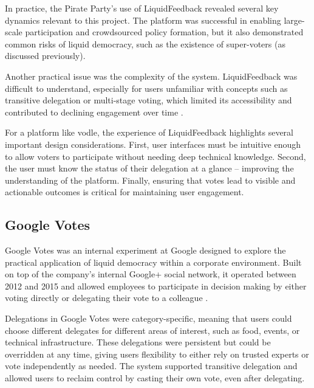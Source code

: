 In practice, the Pirate Party's use of LiquidFeedback revealed several key dynamics relevant to this project. The platform was successful in enabling large-scale participation and crowdsourced policy formation, but it also demonstrated common risks of liquid democracy, such as the existence of super-voters (as discussed previously).

Another practical issue was the complexity of the system. LiquidFeedback was difficult to understand, especially for users unfamiliar with concepts such as transitive delegation or multi-stage voting, which limited its accessibility and contributed to declining engagement over time \citep{kling2015votingbehaviourpoweronline}.

For a platform like vodle, the experience of LiquidFeedback highlights several important design considerations. First, user interfaces must be intuitive enough to allow voters to participate without needing deep technical knowledge. Second, the user must know the status of their delegation at a glance -- improving the understanding of the platform. Finally, ensuring that votes lead to visible and actionable outcomes is critical for maintaining user engagement.

\subsection{Google Votes}\label{subsec:google_votes}
Google Votes was an internal experiment at Google designed to explore the practical application of liquid democracy within a corporate environment. Built on top of the company's internal Google+ social network, it operated between 2012 and 2015 and allowed employees to participate in decision making by either voting directly or delegating their vote to a colleague \citep{hardt_google_2015}.

Delegations in Google Votes were category-specific, meaning that users could choose different delegates for different areas of interest, such as food, events, or technical infrastructure. These delegations were persistent but could be overridden at any time, giving users flexibility to either rely on trusted experts or vote independently as needed. The system supported transitive delegation and allowed users to reclaim control by casting their own vote, even after delegating.


